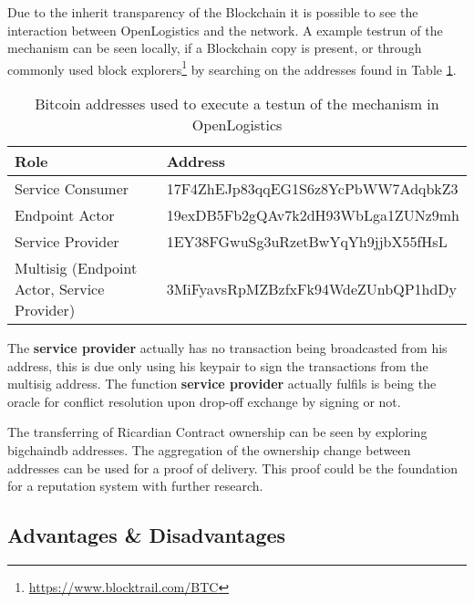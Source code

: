 Due to the inherit transparency of the Blockchain it is possible to see the interaction between OpenLogistics and the network. A example testrun of the mechanism can be seen locally, if a Blockchain copy is present, or through commonly used block explorers\footnote{\url{https://www.blocktrail.com/BTC}}
 by searching on the addresses found in Table \ref{tab:addresses}.

\begin{table}[h]
  \begin{tabular}{ll}
    \hline
    \multicolumn{1}{|l|}{Role}                  & \multicolumn{1}{l|}{Address}                            \\ \hline
    \multicolumn{1}{|l|}{Service Consumer}      & \multicolumn{1}{l|}{17F4ZhEJp83qqEG1S6z8YcPbWW7AdqbkZ3} \\ \hline
    \multicolumn{1}{|l|}{Endpoint Actor}        & \multicolumn{1}{l|}{19exDB5Fb2gQAv7k2dH93WbLga1ZUNz9mh} \\ \hline
    \multicolumn{1}{|l|}{Service Provider}      & \multicolumn{1}{l|}{1EY38FGwuSg3uRzetBwYqYh9jjbX55fHsL} \\ \hline
    \multicolumn{1}{|l|}{Multisig (Endpoint Actor, Service Provider)}      & \multicolumn{1}{l|}{3MiFyavsRpMZBzfxFk94WdeZUnbQP1hdDy } \\ \hline
  \end{tabular}
  \caption{Bitcoin addresses used to execute a testun of the mechanism in OpenLogistics}
  \label{tab:addresses}
\end{table}

The \textbf{service provider} actually has no transaction being broadcasted from his address, this is due only using his keypair to sign the transactions from the multisig address. The function \textbf{service provider} actually fulfils is being the oracle for conflict resolution upon drop-off exchange by signing or not.\par
The transferring of Ricardian Contract ownership can be seen by exploring bigchaindb addresses. The aggregation of the ownership change between addresses can be used for a proof of delivery. This proof could be the foundation for a reputation system with further research.

\subsection{Advantages \& Disadvantages}

